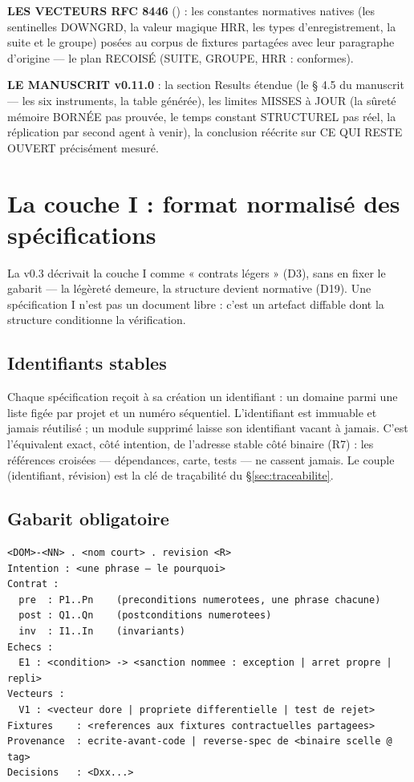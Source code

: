 \textbf{LES VECTEURS RFC 8446} () : les
constantes normatives natives (les sentinelles DOWNGRD, la valeur
magique HRR, les types d'enregistrement, la suite et le groupe) posées
au corpus de fixtures partagées avec leur paragraphe d'origine — le
plan RECOISÉ (SUITE, GROUPE, HRR : conformes).

\textbf{LE MANUSCRIT v0.11.0} : la section Results étendue (le § 4.5 du
manuscrit — les six instruments, la table générée), les limites MISSES à
JOUR (la sûreté mémoire BORNÉE pas prouvée, le temps constant
STRUCTUREL pas réel, la réplication par second agent à venir), la
conclusion réécrite sur CE QUI RESTE OUVERT précisément mesuré.

\section{La couche I : format normalisé des spécifications}\label{sec:coucheI}

La v0.3 décrivait la couche I comme « contrats légers » (D3), sans en fixer le gabarit —
la légèreté demeure, la structure devient normative (D19). Une spécification I n’est pas un
document libre : c’est un artefact diffable dont la structure conditionne la vérification.

\subsection{Identifiants stables}

Chaque spécification reçoit à sa création un identifiant  : un domaine
parmi une liste figée par projet et un numéro séquentiel. L’identifiant est immuable et
jamais réutilisé ; un module supprimé laisse son identifiant vacant à jamais. C’est
l’équivalent exact, côté intention, de l’adresse stable côté binaire (R7) : les références
croisées — dépendances, carte, tests — ne cassent jamais. Le couple (identifiant,
révision) est la clé de traçabilité du §\ref{sec:traceabilite}.

\subsection{Gabarit obligatoire}

\begin{lstlisting}
<DOM>-<NN> . <nom court> . revision <R>
Intention : <une phrase — le pourquoi>
Contrat :
  pre  : P1..Pn    (preconditions numerotees, une phrase chacune)
  post : Q1..Qn    (postconditions numerotees)
  inv  : I1..In    (invariants)
Echecs :
  E1 : <condition> -> <sanction nommee : exception | arret propre | repli>
Vecteurs :
  V1 : <vecteur dore | propriete differentielle | test de rejet>
Fixtures    : <references aux fixtures contractuelles partagees>
Provenance  : ecrite-avant-code | reverse-spec de <binaire scelle @ tag>
Decisions   : <Dxx...>
\end{lstlisting}

